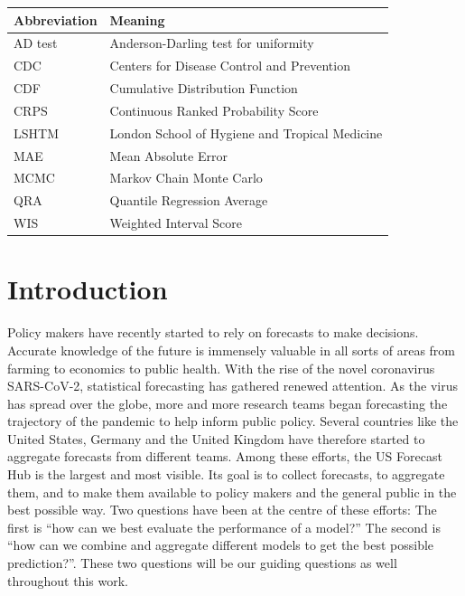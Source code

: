 \documentclass[
]{book}
\begin{document}
\begin{tabular}{ll}

\textbf{Abbreviation} & \textbf{Meaning}\\
\midrule
AD test & Anderson-Darling test for uniformity\\
\addlinespace
CDC & Centers for Disease Control and Prevention\\
\addlinespace
CDF & Cumulative Distribution Function\\
\addlinespace
CRPS & Continuous Ranked Probability Score\\
\addlinespace
LSHTM & London School of Hygiene and Tropical Medicine\\
\addlinespace
MAE & Mean Absolute Error\\
\addlinespace
MCMC & Markov Chain Monte Carlo\\
\addlinespace
QRA & Quantile Regression Average\\
\addlinespace
WIS & Weighted Interval Score\\

\end{tabular}

\tableofcontents

\hypertarget{intro}{%
\chapter{Introduction}\label{intro}}

Policy makers have recently started to rely on forecasts to make decisions. Accurate knowledge of the future is immensely valuable in all sorts of areas from farming to economics to public health. With the rise of the novel coronavirus SARS-CoV-2, statistical forecasting has gathered renewed attention. As the virus has spread over the globe, more and more research teams began forecasting the trajectory of the pandemic to help inform public policy. Several countries like the United States, Germany and the United Kingdom have therefore started to aggregate forecasts from different teams. Among these efforts, the US Forecast Hub \citep{umass-amherstinfluenzaforecastingcenterofexcellenceCovid19forecasthubOrg2020} is the largest and most visible. Its goal is to collect forecasts, to aggregate them, and to make them available to policy makers and the general public in the best possible way. Two questions have been at the centre of these efforts: The first is ``how can we best evaluate the performance of a model?'' The second is ``how can we combine and aggregate different models to get the best possible prediction?''. These two questions will be our guiding questions as well throughout this work.
\end{document}
